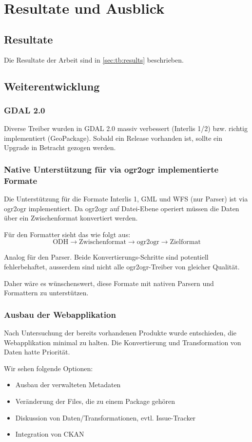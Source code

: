 \chapter{Resultate und Ausblick}

\section{Resultate}
Die Resultate der Arbeit sind in \vref{sec:tb:results} beschrieben.

\section{Weiterentwicklung} \label{sec:tb:further-dev}

\subsection{GDAL 2.0}
Diverse Treiber wurden in GDAL 2.0 massiv verbessert (Interlis 1/2) bzw. richtig implementiert (GeoPackage). Sobald ein Release vorhanden ist, sollte ein Upgrade in Betracht gezogen werden.

\subsection{Native Unterstützung für via ogr2ogr implementierte Formate}
Die Unterstützung für die Formate Interlis 1, GML und WFS (nur Parser) ist via ogr2ogr implementiert. Da ogr2ogr auf Datei-Ebene operiert müssen die Daten über ein Zwischenformat konvertiert werden.

Für den Formatter sieht das wie folgt aus:
$$ \text{ODH} \to \text{Zwischenformat} \to \text{ogr2ogr} \to \text{Zielformat} $$

Analog für den Parser. Beide Konvertierungs-Schritte sind potentiell fehlerbehaftet, ausserdem sind nicht alle ogr2ogr-Treiber von gleicher Qualität.

Daher wäre es wünschenswert, diese Formate mit nativen Parsern und Formattern zu unterstützen. 

\subsection{Ausbau der Webapplikation}
Nach Untersuchung der bereits vorhandenen Produkte wurde entschieden, die Webapplikation minimal zu halten. Die Konvertierung und Transformation von Daten hatte Priorität.

Wir sehen folgende Optionen:
\begin{itemize}
\item Ausbau der verwalteten Metadaten
\item Veränderung der Files, die zu einem Package gehören
\item Diskussion von Daten/Transformationen, evtl. Issue-Tracker
\item Integration von CKAN
\end{itemize}

